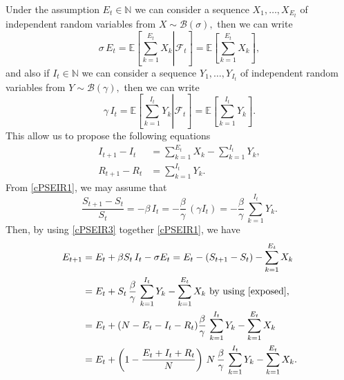 \documentclass[12pt]{article}\usepackage[]{graphicx}\usepackage[]{color}
\begin{document}
Under the assumption $E_t \in \mathbb{N}$ we can consider a sequence $X_1,\ldots,X_{E_t}$ of independent random variables from $X \sim \mathcal{B}(\sigma),$ then we can write
$$
\sigma \, E_t = \mathbb{E}\left[\left. \sum_{k=1}^{E_t} X_{k} \right| \mathcal{F}_t  \right]
=  \mathbb{E}\left[\sum_{k=1}^{E_t} X_{k} \right],
$$
and also if $I_t \in \mathbb{N}$ we can consider a sequence $Y_1,\ldots,Y_{I_t}$ of independent random variables from $Y \sim \mathcal{B}(\gamma),$ then we can write
$$
\gamma \, I_t = \mathbb{E}\left[\left. \sum_{k=1}^{I_t} Y_{k} \right| \mathcal{F}_t  \right]
=  \mathbb{E}\left[\sum_{k=1}^{I_t} Y_{k} \right].
$$
This allow us to propose the following equations 
\begin{align*}
I_{t+1}-I_t & =  \sum_{k=1}^{E_t} X_{k} -  \sum_{k=1}^{I_t} Y_{k},  \\ 
R_{t+1}-R_t & =  \sum_{k=1}^{I_t} Y_{k}. 
\end{align*}
From \eqref{cPSEIR1}, we may assume that
\begin{equation}\label{exposed}
\frac{S_{t+1}-S_t}{S_t} =  - \beta \,I_t = -\frac{\beta}{\gamma} \, (\gamma I_t)  
= -\frac{\beta}{\gamma} \, \sum_{k=1}^{I_t} Y_k.
\end{equation}
Then, by using \eqref{cPSEIR3} together \eqref{cPSEIR1}, we
have
\begin{align*}
E_{t+1} & = E_t + \beta S_t \,I_t - \sigma E_t = E_t - (S_{t+1}-S_t) - \sum_{k=1}^{E_t} X_{k} \\
& = E_t + S_t \, \frac{\beta}{\gamma} \, \sum_{k=1}^{I_t} Y_k - \sum_{k=1}^{E_t} X_{k} \text{ by using \eqref{exposed}, } \\
& =  E_t + (N-E_t-I_t-R_t) \frac{\beta}{\gamma} \, \sum_{k=1}^{I_t} Y_k - \sum_{k=1}^{E_t} X_{k} \\
& =  E_t + \left(1-\frac{E_t+I_t+R_t}{N}\right)\, N \, \frac{\beta}{\gamma} \, \sum_{k=1}^{I_t} Y_k - \sum_{k=1}^{E_t} X_{k}.
\end{align*}
\end{document}
